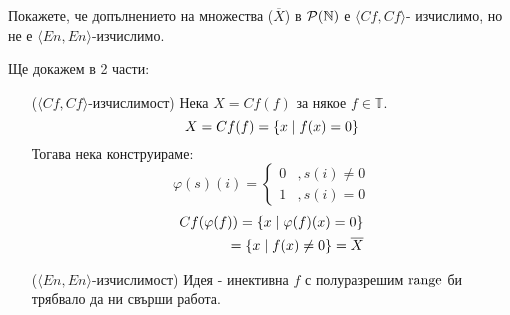 \begin{problem}
Покажете, че допълнението на множества ($\overline X$) в $\mathcal P({\mathbb{N}})$ е $\langle Cf, Cf\rangle$- изчислимо, но не е $\langle En, En\rangle$-изчислимо.
\end{problem}
\begin{solution}
    Ще докажем в 2 части:
    \begin{itemize}
        \item[($\langle Cf, Cf\rangle$-изчислимост)] Нека $X = Cf(f)$ за някое $f \in \mathbb T$.
              \begin{equation}
                  X = Cf(f) = \left\{x \mid f(x) = 0\right\}
              \end{equation}
              Тогава нека конструираме:
              \begin{equation}
                  \varphi(s)(i) = \begin{cases}
                      0 & , s(i) \neq 0 \\
                      1 & , s(i) = 0
                  \end{cases}
              \end{equation}
              \begin{equation}
                  \begin{split}
                      Cf(\varphi(f)) = \left\{x \mid \varphi(f)(x) = 0\right\} \\
                      = \left\{x \mid f(x) \neq 0\right\} = \overline{X}
                  \end{split}
              \end{equation}
        \item[($\langle En, En\rangle$-изчислимост)] Идея - инективна $f$ с полуразрешим $\operatorname*{range}$ би трябвало да ни свърши работа.
    \end{itemize}
\end{solution}

